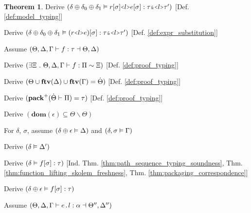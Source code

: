 \documentclass[acmsmall]{acmart}
\theoremstyle{definition}
\newtheorem{theorem}{Theorem}[section]
\begin{document}
\begin{theorem}
  \item \I\I \N Derive $(
    \delta \oplus \delta_0 \oplus \delta_1 \satisfies r[\sigma]\J{<}l\J{>}e[\sigma] \hastype \tau \J{\&} \J{<}l\J{>}\tau'
  )$ [Def. \ref{def:model_typing}]

  \item \I\I \N Derive $(
    \delta \oplus \delta_0 \oplus \delta_1 \satisfies (r\J{<}l\J{>}e)[\sigma] \hastype \tau \J{\&} \J{<}l\J{>}\tau'
  )$ [Def. \ref{def:expr_substitution}]


  \item \N Assume $(
    \Theta, \Delta, \Gamma \vdash f : \tau \dashv \Theta, \Delta
  )$

  \item \I \N Derive $(
    \exists \Xi \ .\  \Theta, \Delta, \Gamma \vdash f : \Pi \sim \Xi
  )$ [Def. \ref{def:proof_typing}]

  \item \I \N Derive $(
    \Theta \cup \textbf{ftv}(\Delta) \cup \textbf{ftv}(\Gamma) = \dot{\Theta}
  )$ [Def. \ref{def:proof_typing}]

  \item \I \N Derive $(
    \textbf{pack}^+(\dot{\Theta} \vdash \Pi) = \tau
  )$ [Def. \ref{def:proof_typing}]

  \item \I \N Derive $(
    \textbf{dom}(\epsilon) \subseteq \Theta \backslash \Theta
  )$

  \item \I \N For $\delta$, $\sigma$,
    assume $(\delta \oplus \epsilon \vDash \Delta)$
    and $(\delta, \sigma \vDash \Gamma)$

  \item \I\I \N Derive $(
    \delta \vDash \Delta'
  )$

  \item \I\I \N Derive $(
    \delta \vDash f[\sigma] : \tau
  )$ [Ind. Thm. \ref{thm:path_sequence_typing_soundness}, Thm. \ref{thm:function_lifting_skolem_freshness},
      Thm. \ref{thm:packaging_correspondence}]

  \item \I\I \N Derive $(
    \delta \oplus \epsilon \vDash f[\sigma] : \tau
  )$ 


  \item \N Assume $(
    \Theta, \Delta, \Gamma \entails e \J{.} l \hastype \alpha \given \Theta'', \Delta''
  )$


\end{theorem}
\end{document}

